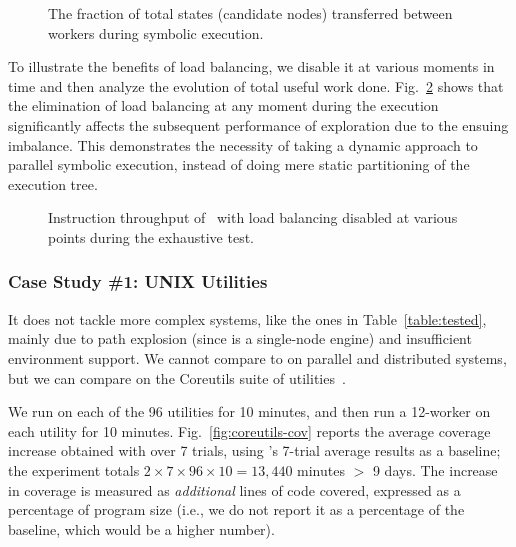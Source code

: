 \begin{figure}[h!]
  \centering
  \caption{The fraction of total states (candidate nodes) transferred between workers during symbolic execution.}
  \label{fig:scalab-load-balancing}
\end{figure} 

To illustrate the benefits of load balancing, we disable it at various moments in time and then analyze the evolution of total useful work done. Fig.~\ref{fig:scalab-static-balancing} shows that the elimination of load balancing at any moment during the execution significantly affects the subsequent performance of exploration due to the ensuing imbalance.  This demonstrates the necessity of taking a dynamic approach to parallel symbolic execution, instead of doing mere static partitioning of the execution tree.

\begin{figure}[h!]
  \centering
  \caption{Instruction throughput of \cnine\ with load balancing disabled at various points during the exhaustive test.}
  \label{fig:scalab-static-balancing}
  \vspace{-0.5cm}
\end{figure}

\subsubsection{Case Study \#1: UNIX Utilities}
\label{sec:coreutils}

  It does not tackle more complex systems, like the ones in Table~\ref{table:tested}, mainly due to path explosion (since \klee is a single-node engine) and insufficient environment support.  We cannot compare \cnine to \klee on parallel and distributed systems, but we can compare on the Coreutils suite of \unix utilities~\cite{coreutils}.

We run \klee on each of the 96 utilities for 10 minutes, and then  run a 12-worker \cnine on each utility for 10 minutes. Fig.~\ref{fig:coreutils-cov} reports the average coverage increase obtained with \cnine over 7 trials, using \klee's 7-trial average results as a baseline; the experiment totals $2 \times 7 \times 96 \times 10 = 13,440$ minutes $>$ 9 days.  The increase in coverage is measured as {\em additional} lines of code covered, expressed as a percentage of program size (i.e., we do not report it as a percentage of the baseline, which would be a higher number).

